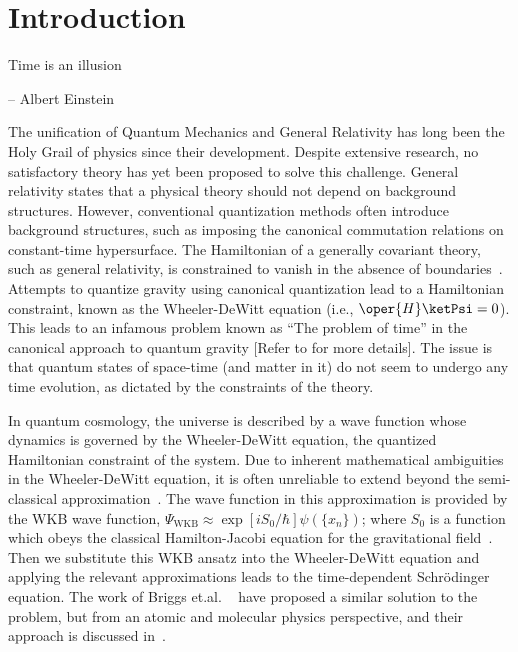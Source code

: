 \chapter{Introduction\label{chap:introduction}}

\epigraph{ \myopeningquote Time is an illusion \myclosingquote}{-- Albert Einstein}



The unification of Quantum Mechanics and General Relativity has long been
the Holy Grail of physics since their development.
Despite extensive research, no satisfactory theory has yet been
proposed to solve this challenge. General relativity states that a physical
theory should not depend on background structures.
However, conventional quantization methods often introduce background structures,
such as imposing the canonical commutation relations on constant-time hypersurface. The Hamiltonian of a
generally covariant theory, such as general relativity, is constrained to
vanish in the absence of boundaries~\cite{gielen2023quantum}. Attempts to quantize gravity using 
canonical quantization lead to a Hamiltonian constraint, known as the Wheeler-DeWitt equation
(i.e., \(\oper{H} \ketPsi = 0\)). This leads to an infamous problem known as
``The problem of time'' in the canonical approach to quantum gravity
[Refer to  for more details]. The issue is that
quantum states of space-time (and matter in it) do not seem to undergo any time evolution, as
dictated by the constraints of the theory. 

In quantum cosmology, the universe is described by a wave function whose dynamics is governed by the Wheeler-DeWitt equation, the quantized Hamiltonian constraint of the system.
Due to inherent mathematical ambiguities in the Wheeler-DeWitt equation, it is often unreliable
to extend beyond the semi-classical approximation~\cite{cooke2010qcintro}. The wave function
in this approximation is provided by the WKB wave function, \(\Psi_{\mathrm{WKB}} 
\approx \exp\left[iS_0/\hbar\right]\psi(\{x_n\})\); where \(S_0\) is 
a function which obeys the classical Hamilton-Jacobi equation for the gravitational
field~\cite{gielen2023quantum}. Then we substitute this WKB ansatz into the
Wheeler-DeWitt equation and applying the relevant approximations leads to the time-dependent 
Schr\"odinger equation.  The work of Briggs et.al.  ~\cite{briggsBraun2004, briggs2001derivation} 
have proposed a similar solution to the problem, but from an atomic and molecular
physics perspective, and their approach is discussed in~.

